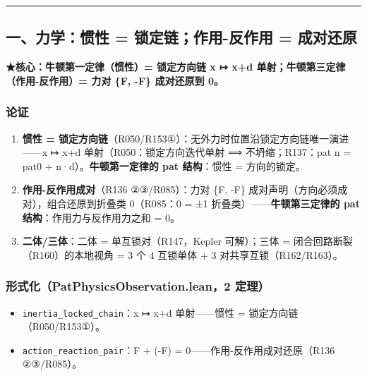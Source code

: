 \documentclass[
]{article}
\providecommand{\tightlist}{%
 \setlength{\itemsep}{0pt}\setlength{\parskip}{0pt}}
\begin{document}
\begin{center}\rule{0.5\linewidth}{0.5pt}\end{center}

\subsection{一、力学：惯性 = 锁定链；作用-反作用 =
成对还原}\label{ux4e00ux529bux5b66ux60efux6027-ux9501ux5b9aux94feux4f5cux7528-ux53cdux4f5cux7528-ux6210ux5bf9ux8fd8ux539f}

\textbf{★核心：牛顿第一定律（惯性）= 锁定方向链 x ↦ x+d
单射；牛顿第三定律（作用-反作用）= 力对 \{F, -F\} 成对还原到 0。}

\subsubsection{论证}\label{ux8bbaux8bc1}

\begin{enumerate}
\def\labelenumi{\arabic{enumi}.}
\tightlist
\item
 \textbf{惯性 =
 锁定方向链}（R050/R153①）：无外力时位置沿锁定方向链唯一演进------x ↦
 x+d 单射（R050：锁定方向迭代单射 ⟹ 不坍缩；R137：pat n = pat0 +
 n·d）。\textbf{牛顿第一定律的 pat 结构}：惯性 = 方向的锁定。
\item
 \textbf{作用-反作用成对}（R136 ②③/R085）：力对 \{F, -F\}
 成对声明（方向必须成对），组合还原到折叠类 0（R085：0 = ±1
 折叠类）------\textbf{牛顿第三定律的 pat 结构}：作用力与反作用力之和 =
 0。
\item
 \textbf{二体/三体}：二体 = 单互锁对（R147，Kepler 可解）；三体 =
 闭合回路断裂（R160）的本地视角 = 3 个 4 互锁单体 + 3
 对共享互锁（R162/R163）。
\end{enumerate}

\subsubsection{形式化（PatPhysicsObservation.lean，2
定理）}\label{ux5f62ux5f0fux5316patphysicsobservation.lean2-ux5b9aux7406}

\begin{itemize}
\tightlist
\item
 \texttt{inertia\_locked\_chain}：x ↦ x+d 单射------惯性 =
 锁定方向链（R050/R153①）。
\item
 \texttt{action\_reaction\_pair}：F + (-F) =
 0------作用-反作用成对还原（R136 ②③/R085）。
\end{itemize}
\end{document}
